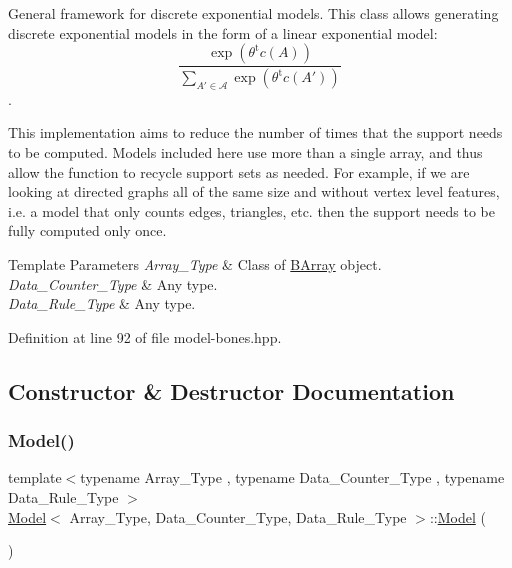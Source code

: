 General framework for discrete exponential models. This class allows generating discrete exponential models in the form of a linear exponential model\+: \[ \frac{ \exp{\left(\theta^{\mbox{t}}c(A)\right)} }{ \sum_{A'\in \mathcal{A}}\exp{\left(\theta^{\mbox{t}}c(A')\right)} } \]. 

This implementation aims to reduce the number of times that the support needs to be computed. Models included here use more than a single array, and thus allow the function to recycle support sets as needed. For example, if we are looking at directed graphs all of the same size and without vertex level features, i.\+e. a model that only counts edges, triangles, etc. then the support needs to be fully computed only once.


\begin{DoxyTemplParams}{Template Parameters}
{\em Array\+\_\+\+Type} & Class of {\ttfamily \hyperlink{class_b_array}{B\+Array}} object. \\
\hline
{\em Data\+\_\+\+Counter\+\_\+\+Type} & Any type. \\
\hline
{\em Data\+\_\+\+Rule\+\_\+\+Type} & Any type. \\
\hline
\end{DoxyTemplParams}


Definition at line 92 of file model-\/bones.\+hpp.



\subsection{Constructor \& Destructor Documentation}
\mbox{\label{class_model_a29e6e0c37d9a892772c5ee95ce1e1043}} 
\subsubsection{\texorpdfstring{Model()}{Model()}\hspace{0.1cm}{\footnotesize\ttfamily [1/3]}}
{\footnotesize\ttfamily template$<$typename Array\+\_\+\+Type , typename Data\+\_\+\+Counter\+\_\+\+Type , typename Data\+\_\+\+Rule\+\_\+\+Type $>$ \\
\hyperlink{class_model}{Model}$<$ Array\+\_\+\+Type, Data\+\_\+\+Counter\+\_\+\+Type, Data\+\_\+\+Rule\+\_\+\+Type $>$\+::\hyperlink{class_model}{Model} (\begin{DoxyParamCaption}{ }\end{DoxyParamCaption})\hspace{0.3cm}{\ttfamily [inline]}}



